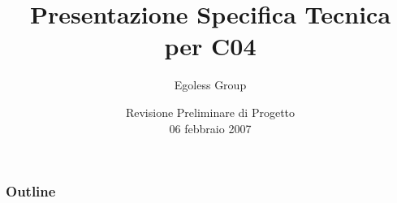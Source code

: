 



\title{Presentazione Specifica Tecnica \\ per C04}

\author{Egoless Group}

\date[RPP 06/02/2007] %
{Revisione Preliminare di Progetto \\ 06 febbraio 2007}

\subject{Presentazione della specifica tecnica per il capitolato C04}








\begin{frame}
  \titlepage
\end{frame}

\begin{frame}
  \frametitle{Outline}
  \tableofcontents
\end{frame}




